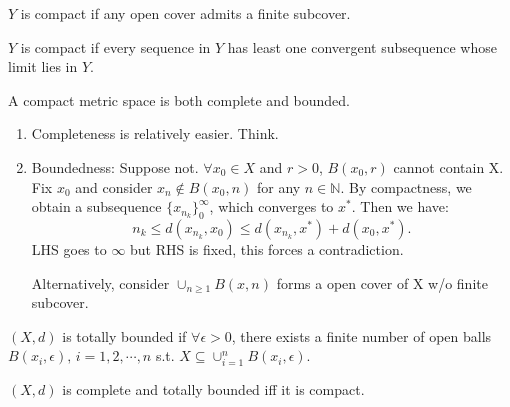 \documentclass[12pt]{article}
\begin{document}
\begin{definition}
  $Y$ is compact if any open cover admits a finite subcover.
\end{definition}


\begin{definition}
  $Y$ is compact if every sequence in $Y$ has least one convergent subsequence whose limit lies in $Y$.
\end{definition}

\begin{theorem}
    A compact metric space is both complete and bounded.
\end{theorem}

\begin{pfbox}
\begin{enumerate}
    \item Completeness is relatively easier. Think.
    \item Boundedness: Suppose not.
    $\forall x_0\in X$ and $r>0$, $B(x_0,r)$ cannot contain X.
    Fix $x_0$ and consider $x_n\notin B(x_0,n)$ for any $n\in \mathbb{N}.$
    By compactness, we obtain a subsequence $\{x_{n_k}\}^\infty_{0}$, which converges to $x^{*}$. Then we have:
    \[
    n_k \leq d(x_{n_k}, x_0) \leq d(x_{n_k}, x^{*}) + d(x_0, x^{*}).
    \]
    LHS goes to $\infty$ but RHS is fixed, this forces a contradiction.

    Alternatively, consider $\cup_{n\geq 1}B(x,n)$ forms a open cover of X w/o finite subcover.
\end{enumerate}
\end{pfbox}



\begin{definition}
    $(X,d)$ is totally bounded if $\forall\epsilon>0$, there exists a finite number of open balls $B(x_i,\epsilon),\, i=1,2,\cdots,n$ s.t. $X\subseteq \cup^n_{i=1}B(x_i,\epsilon).$ 
\end{definition}

\begin{theorem}
    $(X,d)$ is complete and totally bounded iff it is compact.
\end{theorem}
\end{document}
